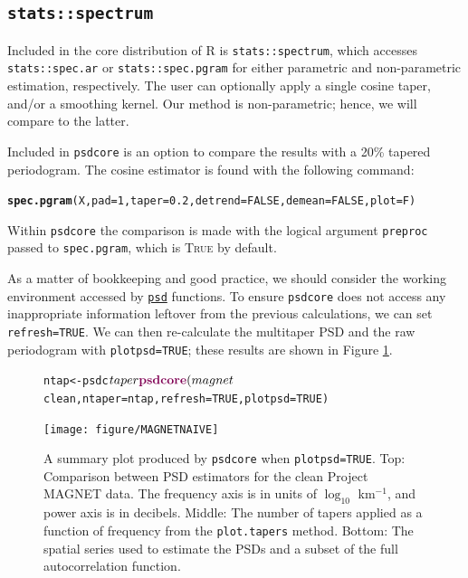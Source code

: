 \documentclass[10pt]{article}\usepackage{graphicx, color}
\makeatletter
\newcommand{\hlfunctioncall}[1]{\textcolor[rgb]{0.501960784313725,0,0.329411764705882}{\textbf{#1}}}%
\newenvironment{kframe}{%
 \def\at@end@of@kframe{}%
 \ifinner\ifhmode%
  \def\at@end@of@kframe{\end{minipage}}%
  \begin{minipage}{\columnwidth}%
 \fi\fi%
 \def\FrameCommand##1{\hskip\@totalleftmargin \hskip-\fboxsep
 \colorbox{shadecolor}{##1}\hskip-\fboxsep
     \hskip-\linewidth \hskip-\@totalleftmargin \hskip\columnwidth}%
 \MakeFramed {\advance\hsize-\width
   \@totalleftmargin\z@ \linewidth\hsize
   \@setminipage}}%
 {\par\unskip\endMakeFramed%
 \at@end@of@kframe}
\newenvironment{knitrout}{}{} %
\newcommand{\SC}[1]{\textsc{#1}}
\newcommand{\Rcmd}[1]{\texttt{#1}}
\newcommand{\psd}[0]{\href{http://abarbour.github.com/psd/}{\color{blue}\Rcmd{psd}}}
\makeatother
\begin{document}
\subsection{\Rcmd{stats::spectrum}}

Included in the core distribution of R is \Rcmd{stats::spectrum}, which
accesses \Rcmd{stats::spec.ar} or \Rcmd{stats::spec.pgram} for either
parametric and non-parametric estimation, respectively.  
The user can optionally apply a single cosine taper, and/or a smoothing kernel.
Our method is non-parametric; hence, we will compare to the latter.

Included in \Rcmd{psdcore} is an option to compare the 
results with a 20\% tapered periodogram.
The cosine estimator is found with the following command:
\begin{knitrout}
\color{fgcolor}\begin{kframe}
\begin{alltt}
\hlfunctioncall{spec.pgram}(X, pad = 1, taper = 0.2, detrend = FALSE, demean = FALSE, plot = F)
\end{alltt}
\end{kframe}
\end{knitrout}

Within \Rcmd{psdcore} the comparison is
made with
the logical argument \Rcmd{preproc} 
passed to \Rcmd{spec.pgram}, which is \SC{True} by default.

As a matter of bookkeeping and good practice, 
we should consider the working environment
accessed by \psd{} functions.
To ensure
\Rcmd{psdcore} does not access any inappropriate information leftover
from the previous calculations, we
can set \Rcmd{refresh=TRUE}.
We can then
re-calculate the multitaper PSD and the
raw periodogram with \Rcmd{plotpsd=TRUE}; these
results are shown in Figure \ref{fig:two}.
%
\begin{figure}[htb!]
\begin{center}
\begin{knitrout}
\color{fgcolor}\begin{kframe}
\begin{alltt}
ntap <- psdc$taper
\hlfunctioncall{psdcore}(magnet$clean, ntaper = ntap, refresh = TRUE, plotpsd = TRUE)
\end{alltt}
\end{kframe}
\texttt{[image: figure/MAGNETNAIVE]} 

\end{knitrout}

\caption{A summary plot produced by \Rcmd{psdcore} when
\Rcmd{plotpsd=TRUE}.  
Top: Comparison between PSD estimators for the 
clean Project MAGNET data. The frequency axis is in units of $\log_{10}$ km$^{-1}$,
and power axis is in decibels.
Middle: The number of tapers applied as a function of frequency from
the \Rcmd{plot.tapers} method. 
Bottom: The spatial series used to estimate the PSDs and a subset
of the full autocorrelation function.}
\label{fig:two}
\end{center}
\end{figure}
\end{document}
